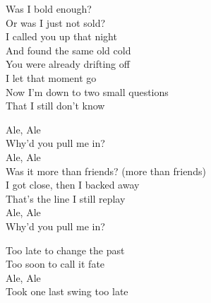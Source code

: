 \begin{lyrics}
Was I bold enough?\\
Or was I just not sold?\\
I called you up that night\\
And found the same old cold\\
You were already drifting off\\
I let that moment go\\
Now I’m down to two small questions\\
That I still don’t know

Ale, Ale\\
Why’d you pull me in?\\
Ale, Ale\\
Was it more than friends? (more than friends)\\
I got close, then I backed away\\
That’s the line I still replay\\
Ale, Ale\\
Why’d you pull me in?

Too late to change the past\\
Too soon to call it fate\\
Ale, Ale\\
Took one last swing too late

\end{lyrics}

